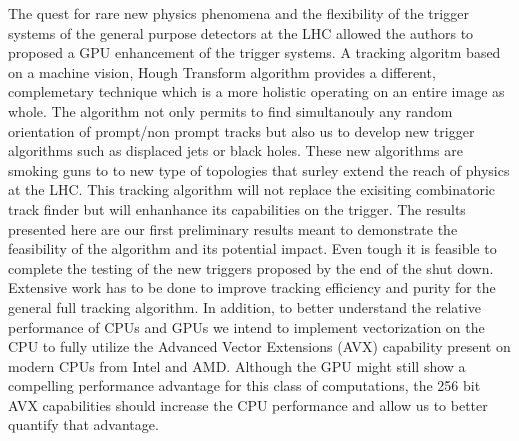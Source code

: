\documentclass{JINST}
\begin{document}
The quest for rare new physics phenomena and the flexibility of the trigger systems of the general purpose detectors at the LHC 
allowed the authors to proposed a GPU enhancement of the trigger systems.  A tracking algoritm based on a machine vision, Hough Transform algorithm provides
a different, complemetary technique  which is a more holistic operating on an entire image as whole. The algorithm not only permits to find simultanouly any
 random orientation of prompt/non prompt tracks but also us to develop new trigger algorithms such as displaced jets or black holes. These new algorithms are smoking guns to 
to new type of topologies  that surley extend the reach of physics at the LHC. This tracking algorithm will not replace the exisiting combinatoric track 
finder but will enhanhance its capabilities on the trigger. The results presented here are our first preliminary results meant to demonstrate the feasibility of the 
algorithm and its potential impact. Even tough it is feasible to complete the testing of the new triggers proposed by the end of the shut down.
Extensive work has to be done to improve tracking efficiency and purity for the general full tracking algorithm. In addition, 
to better understand the relative performance of CPUs and GPUs we intend to implement vectorization on the CPU to fully utilize the Advanced Vector Extensions (AVX) 
capability present on modern CPUs from Intel and AMD.  Although the GPU might still show a compelling performance advantage for this class of computations, 
the 256 bit AVX capabilities should increase the CPU performance and allow us to better quantify that advantage.


\end{document}
